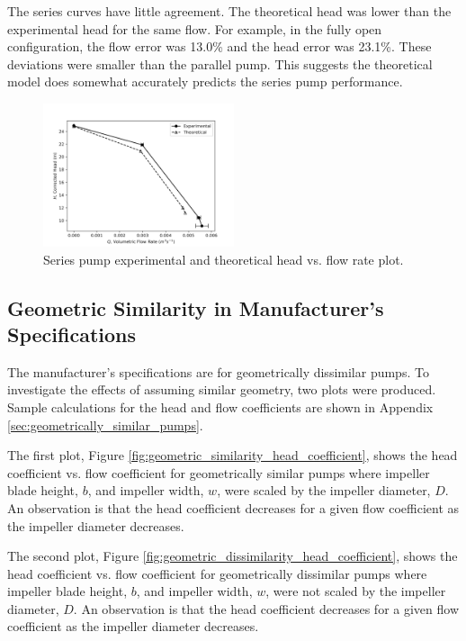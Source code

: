The series curves have little agreement. The theoretical head was lower than the experimental head for the same flow. For example, in the fully open configuration, the flow error was 13.0\% and the head error was 23.1\%. These deviations were smaller than the parallel pump. This suggests the theoretical model does somewhat accurately predicts the series pump performance.

\begin{figure}[H]
    \centering
    \includegraphics[width=0.5\textwidth]{Sections/Figures/Series Pump Plot.png}
    \caption{Series pump experimental and theoretical head vs. flow rate plot.}
    \label{fig:series_pump_plot}
\end{figure}

\subsection{Geometric Similarity in Manufacturer's Specifications}
The manufacturer's specifications are for geometrically dissimilar pumps. To investigate the effects of assuming similar geometry, two plots were produced. Sample calculations for the head and flow coefficients are shown in Appendix \ref{sec:geometrically_similar_pumps}.

The first plot, Figure \ref{fig:geometric_similarity_head_coefficient}, shows the head coefficient vs. flow coefficient for geometrically similar pumps where impeller blade height, $b$, and impeller width, $w$, were scaled by the impeller diameter, $D$. An observation is that the head coefficient decreases for a given flow coefficient as the impeller diameter decreases.  

The second plot, Figure \ref{fig:geometric_dissimilarity_head_coefficient}, shows the head coefficient vs. flow coefficient for geometrically dissimilar pumps where impeller blade height, $b$, and impeller width, $w$, were not scaled by the impeller diameter, $D$. An observation is that the head coefficient decreases for a given flow coefficient as the impeller diameter decreases. 


